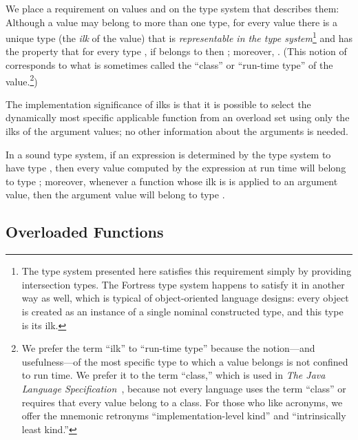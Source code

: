 We place a requirement on values and on the type system that describes them: 
Although a value may belong to more than one type, 
for every value  there is a unique type  
(the \emph{ilk} of the value) 
that is \emph{representable in the type system}\footnote{The
type system presented here satisfies this requirement 
simply by providing intersection types.  
The Fortress type system happens to satisfy it in another way as well, 
which is typical of object-oriented language designs: 
every object is created as an instance of a single nominal constructed type, 
and this type is its ilk.} 
and has the property that for every type , 
if  belongs to  then ;
moreover, .  
(This notion of  corresponds to what is sometimes called the
``class'' or ``run-time type'' of the value.\footnote{%
We prefer the term ``ilk'' to ``run-time type'' 
because the notion---and usefulness---of 
the most specific type to which a value belongs 
is not confined to run time.
We prefer it to the term ``class,'' 
which is used in {\it The Java Language Specification}~\cite{JavaSpec}, 
because not every language uses the term ``class'' 
or requires that every value belong to a class.  
For those who like acronyms, 
we offer the mnemonic retronyms 
``implementation-level kind'' 
and ``intrinsically least kind.''})

The implementation significance of ilks is that it is possible to
select the dynamically most specific applicable function
from an overload set using only the ilks of the argument values; no
other information about the arguments is needed.

In a sound type system,
if an expression is determined by the type system to have type , 
then every value computed by the expression at run time
will belong to type ; 
moreover, 
whenever a function whose ilk is  is applied to an argument value,
then the argument value will belong to type .


\subsection{Overloaded Functions}
\label{terms}

